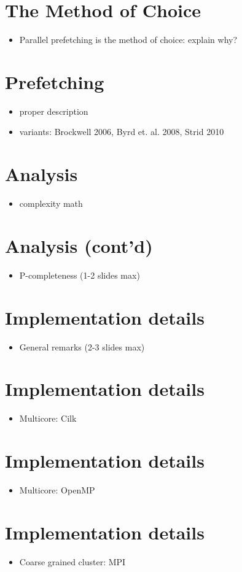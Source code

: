 \documentclass[11pt]{article}       %
\newenvironment{slide}[1]        {\section{#1} \begin{itemize}}%
                                 {\end{itemize}}
\begin{document}
\begin{slide}{The Method of Choice}
\item Parallel prefetching is the method of choice: explain why? 
\end{slide}

\begin{slide}{Prefetching}
\item proper description
\item variants:  Brockwell 2006, Byrd et. al. 2008, Strid 2010
\end{slide}

\begin{slide}{Analysis}
\item complexity math
\end{slide}

\begin{slide}{Analysis (cont'd)}
\item P-completeness (1-2 slides max)
\end{slide} 

\begin{slide}{Implementation details}
\item General remarks (2-3 slides max)
\end{slide}

\begin{slide}{Implementation details}
\item Multicore: Cilk
\end{slide}

\begin{slide}{Implementation details}
\item Multicore: OpenMP
\end{slide}

\begin{slide}{Implementation details}
\item Coarse grained cluster: MPI
\end{slide}





\end{document}
